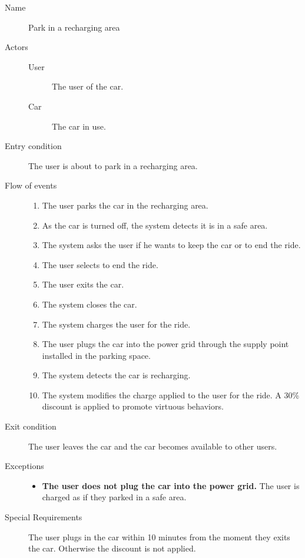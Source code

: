		\begin{description}
			\item[Name] Park in a recharging area
			\item[Actors] \hfill
			\begin{description}
				\item[User] The user of the car.
				\item[Car] The car in use.
			\end{description}
			\item[Entry condition] The user is about to park in a recharging area.
			\item[Flow of events] \hfill
			\begin{enumerate}
				\item The user parks the car in the recharging area.
				\item As the car is turned off, the system detects it is in a safe area.
				\item The system asks the user if he wants to keep the car or to end the ride.
				\item The user selects to end the ride.
				\item The user exits the car.
				\item The system closes the car.
				\item The system charges the user for the ride.
				\item The user plugs the car into the power grid through the supply point installed in the parking space.
				\item The system detects the car is recharging.
				\item The system modifies the charge applied to the user for the ride. A 30\% discount is applied to promote virtuous behaviors.
			\end{enumerate}
			\item[Exit condition] The user leaves the car and the car becomes available to other users.
			\item[Exceptions] \hfill
			\begin{itemize}
				\item \textbf{The user does not plug the car into the power grid.} The user is charged as if they parked in a safe area.
			\end{itemize}
			\item[Special Requirements] The user plugs in the car within 10 minutes from the moment they exits the car. Otherwise the discount is not applied.
		\end{description}	
		
